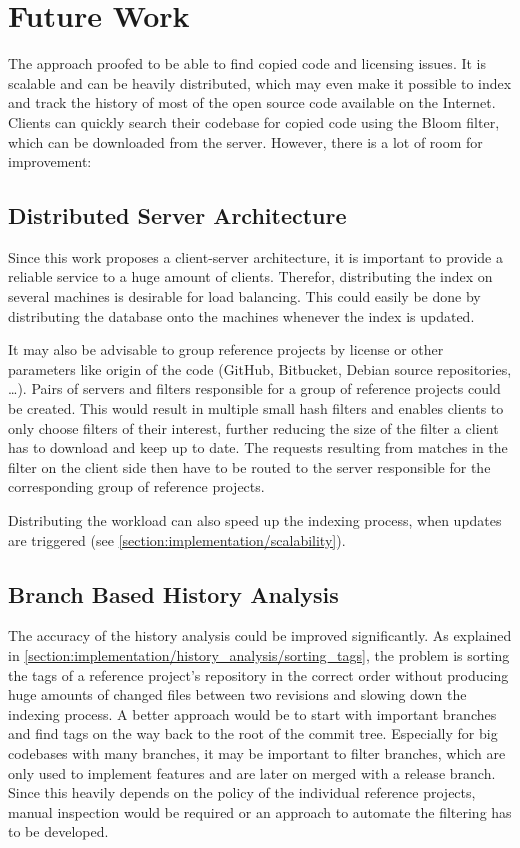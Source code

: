 
\chapter{Future Work}\label{chapter:future_work}
The approach proofed to be able to find copied code and licensing issues.
It is scalable and can be heavily distributed, which may even make it possible to index and track the history of most of the open source code available on the Internet.
Clients can quickly search their codebase for copied code using the Bloom filter, which can be downloaded from the server.
However, there is a lot of room for improvement:

\section{Distributed Server Architecture}
Since this work proposes a client-server architecture, it is important to provide a reliable service to a huge amount of clients.
Therefor, distributing the index on several machines is desirable for load balancing.
This could easily be done by distributing the database onto the machines whenever the index is updated.

It may also be advisable to group reference projects by license or other parameters like origin of the code (GitHub, Bitbucket, Debian source repositories, \dots).
Pairs of servers and filters responsible for a group of reference projects could be created.
This would result in multiple small hash filters and enables clients to only choose filters of their interest, further reducing the size of the filter a client has to download and keep up to date.
The requests resulting from matches in the filter on the client side then have to be routed to the server responsible for the corresponding group of reference projects.

Distributing the workload can also speed up the indexing process, when updates are triggered (see \autoref{section:implementation/scalability}).

\section{Branch Based History Analysis}
The accuracy of the history analysis could be improved significantly.
As explained in \autoref{section:implementation/history_analysis/sorting_tags}, the problem is sorting the tags of a reference project's repository in the correct order without producing huge amounts of changed files between two revisions and slowing down the indexing process.
A better approach would be to start with important branches and find tags on the way back to the root of the commit tree.
Especially for big codebases with many branches, it may be important to filter branches, which are only used to implement features and are later on merged with a release branch.
Since this heavily depends on the policy of the individual reference projects, manual inspection would be required or an approach to automate the filtering has to be developed.

